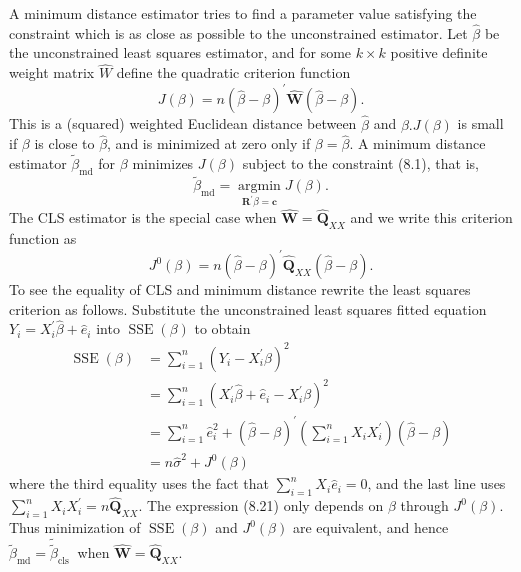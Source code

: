 \documentclass[10pt]{article}
\begin{document}
A minimum distance estimator tries to find a parameter value satisfying the constraint which is as close as possible to the unconstrained estimator. Let $\widehat{\beta}$ be the unconstrained least squares estimator, and for some $k \times k$ positive definite weight matrix $\widehat{W}$ define the quadratic criterion function
$$
J(\beta)=n(\widehat{\beta}-\beta)^{\prime} \widehat{\boldsymbol{W}}(\widehat{\beta}-\beta) .
$$
This is a (squared) weighted Euclidean distance between $\widehat{\beta}$ and $\beta . J(\beta)$ is small if $\beta$ is close to $\widehat{\beta}$, and is minimized at zero only if $\beta=\widehat{\beta}$. A minimum distance estimator $\widetilde{\beta}_{\mathrm{md}}$ for $\beta$ minimizes $J(\beta)$ subject to the constraint (8.1), that is,
$$
\widetilde{\beta}_{\mathrm{md}}=\underset{\boldsymbol{R}^{\prime} \beta=\boldsymbol{c}}{\operatorname{argmin}} J(\beta) .
$$
The CLS estimator is the special case when $\widehat{\boldsymbol{W}}=\widehat{\boldsymbol{Q}}_{X X}$ and we write this criterion function as
$$
J^{0}(\beta)=n(\widehat{\beta}-\beta)^{\prime} \widehat{\boldsymbol{Q}}_{X X}(\widehat{\beta}-\beta) .
$$
To see the equality of CLS and minimum distance rewrite the least squares criterion as follows. Substitute the unconstrained least squares fitted equation $Y_{i}=X_{i}^{\prime} \widehat{\beta}+\widehat{e}_{i}$ into $\operatorname{SSE}(\beta)$ to obtain
$$
\begin{aligned}
\operatorname{SSE}(\beta) &=\sum_{i=1}^{n}\left(Y_{i}-X_{i}^{\prime} \beta\right)^{2} \\
&=\sum_{i=1}^{n}\left(X_{i}^{\prime} \widehat{\beta}+\widehat{e}_{i}-X_{i}^{\prime} \beta\right)^{2} \\
&=\sum_{i=1}^{n} \widehat{e}_{i}^{2}+(\widehat{\beta}-\beta)^{\prime}\left(\sum_{i=1}^{n} X_{i} X_{i}^{\prime}\right)(\widehat{\beta}-\beta) \\
&=n \widehat{\sigma}^{2}+J^{0}(\beta)
\end{aligned}
$$
where the third equality uses the fact that $\sum_{i=1}^{n} X_{i} \widehat{e}_{i}=0$, and the last line uses $\sum_{i=1}^{n} X_{i} X_{i}^{\prime}=n \widehat{\mathbf{Q}}_{X X}$. The expression (8.21) only depends on $\beta$ through $J^{0}(\beta)$. Thus minimization of $\operatorname{SSE}(\beta)$ and $J^{0}(\beta)$ are equivalent, and hence $\widetilde{\beta}_{\mathrm{md}}=\widetilde{\widetilde{\beta}}_{\text {cls }}$ when $\widehat{\boldsymbol{W}}=\widehat{\boldsymbol{Q}}_{X X}$.
\end{document}
